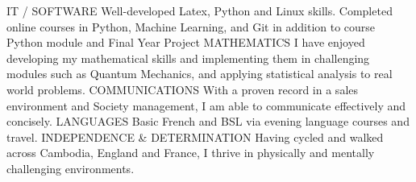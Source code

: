 \begin{cvhonors}
  \cvhonor
    {IT / SOFTWARE}
    {Well-developed Latex, Python and Linux skills. Completed online courses in Python, Machine Learning, and Git in addition to course Python module and Final Year Project}
    {}
    {}
  \cvhonor
    {MATHEMATICS}
    {I have enjoyed developing my mathematical skills and implementing them in challenging modules such as Quantum Mechanics, and applying statistical analysis to real world problems.}
    {}
    {}
    \cvhonor
    {COMMUNICATIONS}
    {With a proven record in a sales environment and Society management, I am able to communicate effectively and concisely.}
    {}
    {}
    \cvhonor
    {LANGUAGES}
    {Basic French and BSL via evening language courses and travel.}
    {}
    {}
    \cvhonor
    {INDEPENDENCE \& DETERMINATION}
    {Having cycled and walked across Cambodia, England and France, I thrive in physically and mentally challenging environments.}
    {}
    {}
\end{cvhonors}
